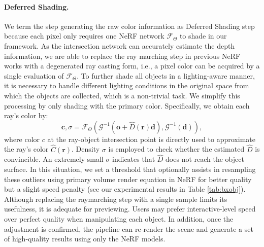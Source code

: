 \documentclass[letterpaper]{article} %
\begin{document}
\paragraph{Deferred Shading.} We term the step generating the raw color information as Deferred Shading step because
each pixel only requires one NeRF network $\mathcal{F}_{\Theta}$ to shade in our framework. As the intersection network can accurately estimate the depth information, we are able to replace the ray marching step in previous NeRF works with a degenerated ray casting form,
i.e., a pixel color can be acquired by a single evaluation of $\mathcal{F}_{\Theta}$. To further shade all objects in a lighting-aware manner, it is necessary to handle different lighting conditions in the original space from which the objects are collected, which is a non-trivial task. We simplify this processing by only shading with the primary color. Specifically, we obtain each ray's color by:
\begin{equation}
    \mathbf{c},\sigma = \mathcal{F}_{\Theta}\left(\mathcal{G}^{-1}(\mathbf{o}+\hat{D}(\mathbf{r})\mathbf{d}),
    \mathcal{G}^{-1}(\mathbf{d})\right),
    \label{eq:deferred_color}
\end{equation}
where color $c$ at the ray-object intersection point is directly used to approximate the ray's color $\hat{C}(\mathbf{r})$. Density $\sigma$ is employed to check whether the estimated $\hat{D}$ is convincible. An extremely small $\sigma$ indicates that $\hat{D}$ does not reach the object surface. In this situation, we set a threshold that optionally assists in resampling these outliers using primary volume render equation in NeRF for better quality but a slight speed penalty (see our experimental results in Table \ref{tab:bxobj}).
Although replacing the raymarching step with a single sample limits its usefulness, it is adequate for previewing.
 Users may prefer interactive-level speed over perfect quality when manipulating each object. In addition, once the adjustment is confirmed, the pipeline can re-render the scene and generate a set of high-quality results using only the NeRF models.
\end{document}
